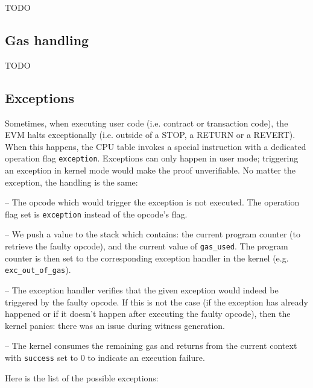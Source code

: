 TODO

\subsection{Gas handling}

TODO

\subsection{Exceptions}
\label{exceptions}

Sometimes, when executing user code (i.e. contract or transaction code), the EVM halts exceptionally (i.e. outside of a STOP, a RETURN or a REVERT).
When this happens, the CPU table invokes a special instruction with a dedicated operation flag \texttt{exception}.
Exceptions can only happen in user mode; triggering an exception in kernel mode would make the proof unverifiable.
No matter the exception, the handling is the same:

-- The opcode which would trigger the exception is not executed. The operation flag set is \texttt{exception} instead of the opcode's flag.

-- We push a value to the stack which contains: the current program counter (to retrieve the faulty opcode), and the current value of \texttt{gas\_used}.
The program counter is then set to the corresponding exception handler in the kernel (e.g. \texttt{exc\_out\_of\_gas}).

-- The exception handler verifies that the given exception would indeed be triggered by the faulty opcode. If this is not the case (if the exception has already happened or if it doesn't happen after executing
the faulty opcode), then the kernel panics: there was an issue during witness generation.

-- The kernel consumes the remaining gas and returns from the current context with \texttt{success} set to 0 to indicate an execution failure.

Here is the list of the possible exceptions:

